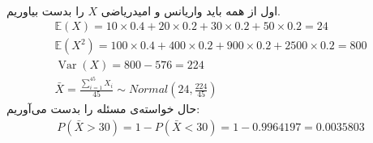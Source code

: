 \\
اول از همه باید واریانس و امیدریاضی
$X$
را بدست بیاوریم.
\begin{gather*}
    \mathbb{E}(X) = 10 \times 0.4 + 20 \times 0.2 + 30 \times 0.2 + 50 \times 0.2 = 24\\
    \mathbb{E}(X^2) = 100 \times 0.4 + 400 \times 0.2 + 900 \times 0.2 + 2500 \times 0.2 = 800\\
    \operatorname{Var}(X) = 800 - 576 = 224\\
    \bar{X} = \frac{\sum_{i=1}^{45} X_i}{45} \sim Normal(24, \frac{224}{45})
\end{gather*}
حال خواسته‌ی مسئله را بدست می‌آوریم:
\begin{gather*}
    P(\bar{X} > 30) = 1 - P(\bar{X} < 30) = 1 - 0.9964197 = 0.0035803
\end{gather*}